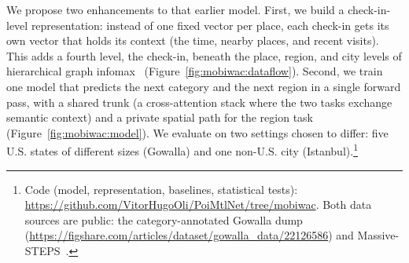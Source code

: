 We propose two enhancements to that earlier model. First, we build a check-in-level representation: instead of one fixed vector per place, each check-in gets its own vector that holds its context (the time, nearby places, and recent visits).
This adds a fourth level, the check-in, beneath the place, region, and city levels of hierarchical graph infomax~\cite{huang2023hgi,velickovic2019deep} (Figure~\ref{fig:mobiwac:dataflow}). Second, we train one model that
predicts the next category and the next region in a single forward pass, with a shared trunk (a cross-attention stack where the two tasks exchange
semantic context) and a private spatial path for the region task (Figure~\ref{fig:mobiwac:model}). We evaluate on two settings chosen to differ: five U.S. states of different sizes (Gowalla) and one non-U.S. city (Istanbul).\footnote{\label{fn:mobiwac:code}Code (model, representation, baselines, statistical tests): \url{https://github.com/VitorHugoOli/PoiMtlNet/tree/mobiwac}. Both data sources are public: the category-annotated Gowalla dump (\url{https://figshare.com/articles/dataset/gowalla_data/22126586}) and Massive-STEPS~\cite{wongso2025massivesteps}.}

